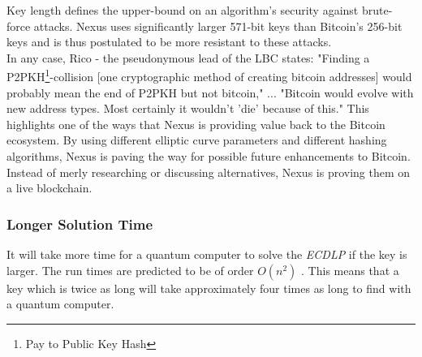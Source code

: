\documentclass[11pt]{article}
\begin{document}
\noindent Key length defines the upper-bound on an algorithm's security \cite{wikikeysize} against brute-force attacks.
Nexus uses significantly larger 571-bit keys than Bitcoin's 256-bit keys and is thus postulated to be more resistant to these attacks.\\ 

\noindent In any case, Rico - the pseudonymous lead of the LBC states: "Finding a P2PKH\footnote{Pay to Public Key Hash\cite{p2pkh}}-collision [one cryptographic method of creating bitcoin addresses] would probably mean the end of P2PKH but not bitcoin," ... "Bitcoin would evolve with new address types. Most certainly it wouldn't 'die' because of this."\cite{largebitcoin}
This highlights one of the ways that Nexus is providing value back to the Bitcoin ecosystem.
By using different elliptic curve parameters and different hashing algorithms, Nexus is paving the way for possible future enhancements to Bitcoin.
Instead of merly researching or discussing alternatives, Nexus is proving them on a live blockchain.

\subsubsection*{Longer Solution Time}

It will take more time for a quantum computer to solve the \textit{ECDLP} if the key is larger.
The run times are predicted to be of order $O(n^2)$ \cite{prooszalka,kayezalka}.
This means that a key which is twice as long will take approximately four times as long to find with a quantum computer.
\end{document}

